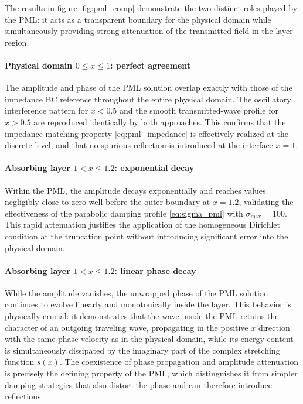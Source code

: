 The results in figure \ref{fig:pml_comp} demonstrate the two distinct roles played by the PML: it acts as a transparent boundary for the physical domain while simultaneously providing strong attenuation of the transmitted field in the layer region.

\paragraph{Physical domain \(0 \leq x \leq 1\): perfect agreement} The amplitude and phase of the PML solution overlap exactly with those of the impedance BC reference throughout the entire physical domain. The oscillatory interference pattern for \(x < 0.5\) and the smooth transmitted-wave profile for \(x > 0.5\) are reproduced identically by both approaches. This confirms that the impedance-matching property \eqref{eq:pml_impedance} is effectively realized at the discrete level, and that no spurious reflection is introduced at the interface \(x = 1\).

\paragraph{Absorbing layer \(1 < x \leq 1.2\): exponential decay} Within the PML, the amplitude decays exponentially and reaches values negligibly close to zero well before the outer boundary at \(x = 1.2\), validating the effectiveness of the parabolic damping profile \eqref{eq:sigma_pml} with \(\sigma_{\max} = 100\). This rapid attenuation justifies the application of the homogeneous Dirichlet condition at the truncation point without introducing significant error into the physical domain.

\paragraph{Absorbing layer \(1 < x \leq 1.2\): linear phase decay} While the amplitude vanishes, the unwrapped phase of the PML solution continues to evolve linearly and monotonically inside the layer. This behavior is physically crucial: it demonstrates that the wave inside the PML retains the character of an outgoing traveling wave, propagating in the positive \(x\) direction with the same phase velocity as in the physical domain, while its energy content is simultaneously dissipated by the imaginary part of the complex stretching function \(s(x)\). The coexistence of phase propagation and amplitude attenuation is precisely the defining property of the PML, which distinguishes it from simpler damping strategies that also distort the phase and can therefore introduce reflections.